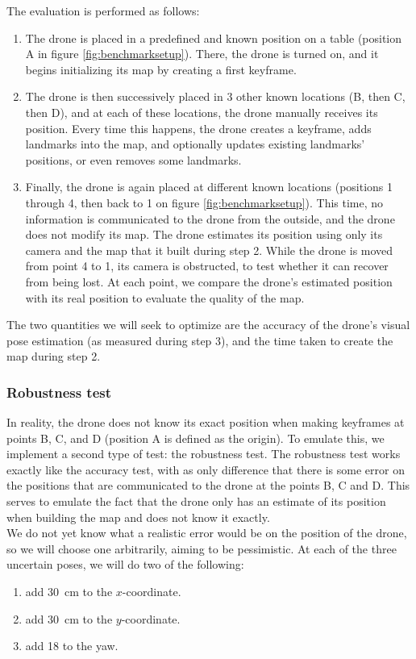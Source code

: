 The evaluation is performed as follows:
\begin{enumerate}
  \item The drone is placed in a predefined and known position on a table (position A in figure \ref{fig:benchmarksetup}). There, the drone is turned on, and it begins initializing its map by creating a first keyframe.
  \item The drone is then successively placed in 3 other known locations (B, then C, then D), and at each of these locations, the drone manually receives its position. Every time this happens, the drone creates a keyframe, adds landmarks into the map, and optionally updates existing landmarks' positions, or even removes some landmarks.
  \item Finally, the drone is again placed at different known locations (positions 1 through 4, then back to 1 on figure \ref{fig:benchmarksetup}). This time, no information is communicated to the drone from the outside, and the drone does not modify its map. The drone estimates its position using only its camera and the map that it built during step 2. While the drone is moved from point 4 to 1, its camera is obstructed, to test whether it can recover from being lost. At each point, we compare the drone's estimated position with its real position to evaluate the quality of the map.
\end{enumerate}
The two quantities we will seek to optimize are the accuracy of the drone's visual pose estimation (as measured during step 3), and the time taken to create the map during step 2.\\
\subsubsection{Robustness test}
In reality, the drone does not know its exact position when making keyframes at points B, C, and D (position A is defined as the origin). To emulate this, we implement a second type of test: the robustness test. The robustness test works exactly like the accuracy test, with as only difference that there is some error on the positions that are communicated to the drone at the points B, C and D. This serves to emulate the fact that the drone only has an estimate of its position when building the map and does not know it exactly.\\

We do not yet know what a realistic error would be on the position of the drone, so we will choose one arbitrarily, aiming to be pessimistic. At each of the three uncertain poses, we will do two of the following:
\begin{enumerate}
\item add \SI{30}{\centi\meter} to the $x$-coordinate.\\
\item add \SI{30}{\centi\meter} to the $y$-coordinate.\\ 
\item add \num{18}{\degree} to the yaw.\\
\end{enumerate}

